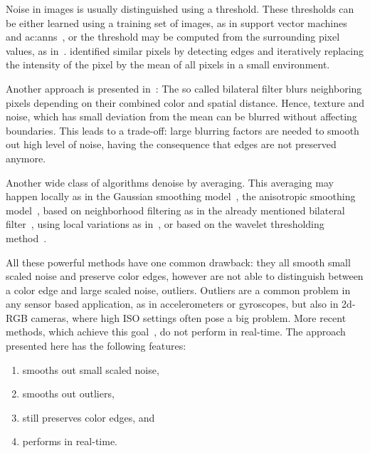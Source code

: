 Noise in images is usually distinguished using a threshold. 
These thresholds can be either learned using a training set of images, as in support vector machines~\cite{yang2010svm} and \glspl{ac:ann}~\cite{muneyasu1995realization,pandey2016anatomization}, or the threshold may be computed from the surrounding pixel values, as in~\cite{du2011dynamic}. 
\cite{lev1977iterative} identified similar pixels by detecting edges and iteratively replacing the intensity of the pixel by the mean of all pixels in a small environment.

Another approach is presented in~\cite{tomasi1998bilateral}: The so called bilateral filter blurs neighboring pixels depending on their combined color and spatial distance. 
Hence, texture and noise, which has small deviation from the mean can be blurred without affecting boundaries. 
This leads to a trade-off: large blurring factors are needed to smooth out high level of noise, having the consequence that edges are not preserved anymore.

Another wide class of algorithms denoise by averaging. 
This averaging may happen locally as in the Gaussian smoothing model~\cite{lindenbaum1994gabor}, the anisotropic smoothing model~\cite{perona1990scale,alvarez1992image}, based on neighborhood filtering as in the already mentioned bilateral filter~\cite{tomasi1998bilateral}, using local variations as in~\cite{rudin1992nonlinear}, or based on the wavelet thresholding method~\cite{donoho1995noising}.

All these powerful methods have one common drawback: they all smooth small scaled noise and preserve color edges, however are not able to distinguish between a color edge and large scaled noise, \eg outliers. 
Outliers are a common problem in any sensor based application, as in accelerometers or gyroscopes, but also in 2d-RGB cameras, where high ISO settings often pose a big problem. 
More recent methods, which achieve this goal~\cite{dabov2007image,zoran2011learning,mairal2009non}, do not perform in real-time.
The approach presented here has the following features:

\begin{enumerate}
  \item smooths out small scaled noise,
  \item smooths out outliers,
  \item still preserves color edges, and
  \item performs in real-time.
\end{enumerate}





